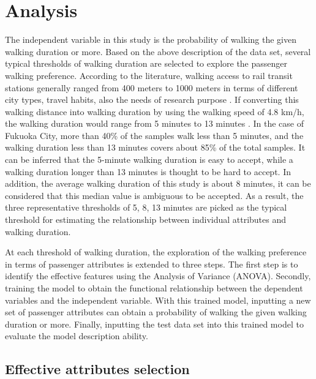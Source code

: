 %
\section{Analysis}
The independent variable in this study is the probability of walking the given walking duration or more. Based on the above description of the data set, several typical thresholds of walking duration are selected to explore the passenger walking preference. According to the literature, walking access to rail transit stations generally ranged from 400 meters to 1000 meters in terms of different city types, travel habits, also the needs of research purpose \cite{guerra2012half,murray1998public,o1996walking,keijer2000people,zhao2003forecasting,alshalalfah2007case}. If converting this walking distance into walking duration by using the walking speed of 4.8 km/h, the walking duration would range from 5 minutes to 13 minutes \cite{bohannon1997comfortable}. In the case of Fukuoka City, more than 40\% of the samples walk less than 5 minutes, and the walking duration less than 13 minutes covers about 85\% of the total samples. It can be inferred that the 5-minute walking duration is easy to accept, while a walking duration longer than 13 minutes is thought to be hard to accept. In addition, the average walking duration of this study is about 8 minutes, it can be considered that this median value is ambiguous to be accepted. As a result, the three representative thresholds of 5, 8, 13 minutes are picked as the typical threshold for estimating the relationship between individual attributes and walking duration. 

At each threshold of walking duration, the exploration of the walking preference in terms of passenger attributes is extended to three steps. The first step is to identify the effective features using the Analysis of Variance (ANOVA). Secondly, training the model to obtain the functional relationship between the dependent variables and the independent variable. With this trained model, inputting a new set of passenger attributes can obtain a probability of walking the given walking duration or more. Finally, inputting the test data set into this trained model to evaluate the model description ability.

%
\subsection{Effective attributes selection}

